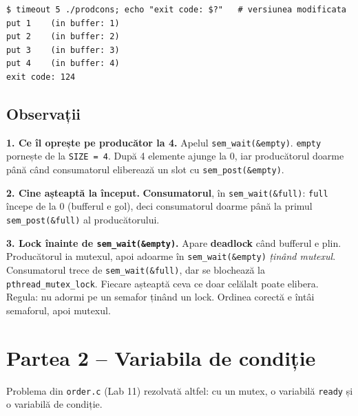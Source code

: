 \documentclass[11pt,a4paper]{article}
\begin{document}
\begin{terminal}
\begin{verbatim}
$ timeout 5 ./prodcons; echo "exit code: $?"   # versiunea modificata
put 1    (in buffer: 1)
put 2    (in buffer: 2)
put 3    (in buffer: 3)
put 4    (in buffer: 4)
exit code: 124
\end{verbatim}
\end{terminal}

\subsection*{Observații}
\begin{answer}
\textbf{1. Ce îl oprește pe producător la 4.} Apelul \texttt{sem\_wait(\&empty)}. \texttt{empty} pornește de la
\texttt{SIZE = 4}. După 4 elemente ajunge la 0, iar producătorul doarme până când consumatorul eliberează un slot cu
\texttt{sem\_post(\&empty)}.

\medskip
\textbf{2. Cine așteaptă la început.} \textbf{Consumatorul}, în \texttt{sem\_wait(\&full)}: \texttt{full} începe de la 0
(bufferul e gol), deci consumatorul doarme până la primul \texttt{sem\_post(\&full)} al producătorului.

\medskip
\textbf{3. Lock înainte de \texttt{sem\_wait(\&empty)}.} Apare \textbf{deadlock} când bufferul e plin. Producătorul ia
mutexul, apoi adoarme în \texttt{sem\_wait(\&empty)} \emph{ținând mutexul}. Consumatorul trece de
\texttt{sem\_wait(\&full)}, dar se blochează la \texttt{pthread\_mutex\_lock}. Fiecare așteaptă ceva ce doar celălalt
poate elibera. Regula: nu adormi pe un semafor ținând un lock. Ordinea corectă e întâi semaforul, apoi mutexul.
\end{answer}

\section{Partea 2 -- Variabila de condiție}
Problema din \texttt{order.c} (Lab 11) rezolvată altfel: cu un mutex, o variabilă \texttt{ready} și o variabilă de
condiție.
\end{document}
